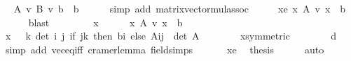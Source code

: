 \begin{isabellebody}
\ \isamarkupfalse%
\ {\isachardoublequoteopen}A\ {\isacharasterisk}{\kern0pt}v\ {\isacharparenleft}{\kern0pt}B\ {\isacharasterisk}{\kern0pt}v\ b{\isacharparenright}{\kern0pt}\ {\isacharequal}{\kern0pt}\ b{\isachardoublequoteclose}\isanewline
\ \ \ \ \isamarkupfalse%
\ {\isacharparenleft}{\kern0pt}simp\ add{\isacharcolon}{\kern0pt}\ matrix{\isacharunderscore}{\kern0pt}vector{\isacharunderscore}{\kern0pt}mul{\isacharunderscore}{\kern0pt}assoc{\isacharparenright}{\kern0pt}\isanewline
\ \ \isamarkupfalse%
\ \isamarkupfalse%
\ xe{\isacharcolon}{\kern0pt}\ {\isachardoublequoteopen}{\isasymexists}x{\isachardot}{\kern0pt}\ A\ {\isacharasterisk}{\kern0pt}v\ x\ {\isacharequal}{\kern0pt}\ b{\isachardoublequoteclose}\isanewline
\ \ \ \ \isamarkupfalse%
\ blast\isanewline
\ \ \isacommand{{\isacharbraceleft}{\kern0pt}}\isamarkupfalse%
\isanewline
\ \ \ \ \isamarkupfalse%
\ x\isanewline
\ \ \ \ \isamarkupfalse%
\ x{\isacharcolon}{\kern0pt}\ {\isachardoublequoteopen}A\ {\isacharasterisk}{\kern0pt}v\ x\ {\isacharequal}{\kern0pt}\ b{\isachardoublequoteclose}\isanewline
\ \ \ \ \isamarkupfalse%
\ {\isachardoublequoteopen}x\ {\isacharequal}{\kern0pt}\ {\isacharparenleft}{\kern0pt}{\isasymchi}\ k{\isachardot}{\kern0pt}\ det{\isacharparenleft}{\kern0pt}{\isasymchi}\ i\ j{\isachardot}{\kern0pt}\ if\ j{\isacharequal}{\kern0pt}k\ then\ b{\isachardollar}{\kern0pt}i\ else\ A{\isachardollar}{\kern0pt}i{\isachardollar}{\kern0pt}j{\isacharparenright}{\kern0pt}\ {\isacharslash}{\kern0pt}\ det\ A{\isacharparenright}{\kern0pt}{\isachardoublequoteclose}\isanewline
\ \ \ \ \ \ \isamarkupfalse%
\ x{\isacharbrackleft}{\kern0pt}symmetric{\isacharbrackright}{\kern0pt}\isanewline
\ \ \ \ \ \ \isamarkupfalse%
\ d{}\ \isamarkupfalse%
\ {\isacharparenleft}{\kern0pt}simp\ add{\isacharcolon}{\kern0pt}\ vec{\isacharunderscore}{\kern0pt}eq{\isacharunderscore}{\kern0pt}iff\ cramer{\isacharunderscore}{\kern0pt}lemma\ field{\isacharunderscore}{\kern0pt}simps{\isacharparenright}{\kern0pt}\isanewline
\ \ \isacommand{{\isacharbraceright}{\kern0pt}}\isamarkupfalse%
\isanewline
\ \ \isamarkupfalse%
\ xe\ \isamarkupfalse%
\ {\isacharquery}{\kern0pt}thesis\isanewline
\ \ \ \ \isamarkupfalse%
\ auto\isanewline
{}\isamarkupfalse%
%
\endisatagproof
{\isafoldproof}%
%
\isadelimproof
\isanewline
%
\endisadelimproof
\isanewline
{}\isamarkupfalse%

\end{isabellebody}
